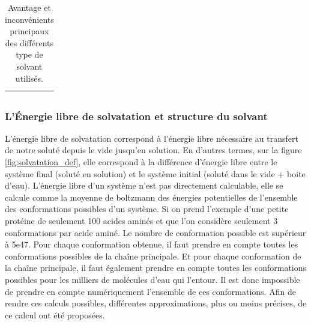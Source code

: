 \begin{table}[H]
\begin{tabular}{ l | c c | c c }
  \hline \multicolumn{5}{c}{} \\[-1em]\hline
  \end{tabular}
  \caption{Avantage et inconvénients principaux des différents type de solvant utilisés.}
  \label{tab:temps_calculs}  
\end{table}







\subsubsection{L'\'Energie libre de solvatation et structure du solvant}
L'énergie libre de solvatation correspond à l'énergie libre nécessaire au transfert de notre soluté depuis le vide jusqu'en solution. En d'autres termes, sur la figure \ref{fig:solvatation_def}, elle correspond à la différence d'énergie libre entre le système final (soluté en solution) et le système initial (soluté dans le vide + boite d'eau). L'énergie libre d'un système n'est pas directement calculable, elle se calcule comme la moyenne de boltzmann des énergies potentielles de l'ensemble des conformations possibles d'un système. Si on prend l'exemple d'une petite protéine de seulement 100 acides aminés et que l'on considère seulement 3 conformations par acide aminé. Le nombre de conformation possible est supérieur à 5e47. Pour chaque conformation obtenue, il faut prendre en compte toutes les conformations possibles de la chaîne principale. Et pour chaque conformation de la chaîne principale, il faut également prendre en compte toutes les conformations possibles pour les milliers de molécules d'eau qui l'entour. Il est donc impossible de prendre en compte numériquement l'ensemble de ces conformations. Afin de rendre ces calculs possibles, différentes approximations, plus ou moins précises, de ce calcul ont été proposées.


